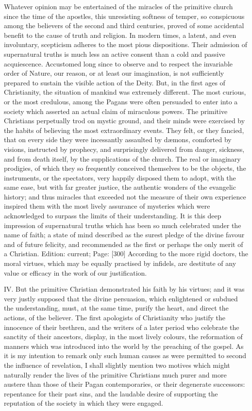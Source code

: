 Whatever opinion may be entertained of the miracles of the primitive church since the time of the apostles, this unresisting softness of temper, so conspicuous among the believers of the second and third centuries, proved of some accidental benefit to the cause of truth and religion. In modern times, a latent, and even involuntary, scepticism adheres to the most pious dispositions. Their admission of supernatural truths is much less an active consent than a cold and passive acquiescence. Accustomed long since to observe and to respect the invariable order of Nature, our reason, or at least our imagination, is not sufficiently prepared to sustain the visible action of the Deity. But, in the first ages of Christianity, the situation of mankind was extremely different. The most curious, or the most credulous, among the Pagans were often persuaded to enter into a society which asserted an actual claim of miraculous powers. The primitive Christians perpetually trod on mystic ground, and their minds were exercised by the habits of believing the most extraordinary events. They felt, or they fancied, that on every side they were incessantly assaulted by dæmons, comforted by visions, instructed by prophecy, and surprisingly delivered from danger, sickness, and from death itself, by the supplications of the church. The real or imaginary prodigies, of which they so frequently conceived themselves to be the objects, the instruments, or the spectators, very happily disposed them to adopt, with the same ease, but with far greater justice, the authentic wonders of the evangelic history; and thus miracles that exceeded not the measure of their own experience inspired them with the most lively assurance of mysteries which were acknowledged to surpass the limits of their understanding. It is this deep impression of supernatural truths which has been so much celebrated under the name of faith; a state of mind described as the surest pledge of the divine favour and of future felicity, and recommended as the first or perhaps the only merit of a Christian. Edition: current; Page: [300] According to the more rigid doctors, the moral virtues, which may be equally practised by infidels, are destitute of any value or efficacy in the work of our justification.

IV. But the primitive Christian demonstrated his faith by his virtues; and it was very justly supposed that the divine persuasion, which enlightened or subdued the understanding, must, at the same time, purify the heart, and direct the actions, of the believer. The first apologists of Christianity who justify the innocence of their brethren, and the writers of a later period who celebrate the sanctity of their ancestors, display, in the most lively colours, the reformation of manners which was introduced into the world by the preaching of the gospel. As it is my intention to remark only such human causes as were permitted to second the influence of revelation, I shall slightly mention two motives which might naturally render the lives of the primitive Christians much purer and more austere than those of their Pagan contemporaries, or their degenerate successors: repentance for their past sins, and the laudable desire of supporting the reputation of the society in which they were engaged.

